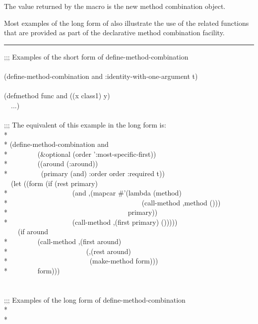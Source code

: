 \begin{defmac}

The value returned by the  macro is the new
method combination object.


Most examples of the long form of  also
illustrate the use of the related functions that are provided as part
of the declarative method combination facility.

\hrule width0pt\relax

\begin{lisp}
;;; Examples of the short form of define-method-combination \\
\\
(define-method-combination and :identity-with-one-argument t) \\
\\
(defmethod func and ((x class1) y) \\
~~...) \\
\\
;;; The equivalent of this example in the long form is: \\*
\\*
(define-method-combination and \\*
~~~~~~~~(\&optional (order ':most-specific-first)) \\*
~~~~~~~~((around (:around)) \\*
~~~~~~~~~(primary (and) :order order :required t)) \\
~~(let ((form (if (rest primary) \\*
~~~~~~~~~~~~~~~~~~{\Xbq}(and ,{\Xatsign}(mapcar \#'(lambda (method) \\*
~~~~~~~~~~~~~~~~~~~~~~~~~~~~~~~~~~~~~~{\Xbq}(call-method ,method ())) \\*
~~~~~~~~~~~~~~~~~~~~~~~~~~~~~~~~~~primary)) \\*
~~~~~~~~~~~~~~~~~~{\Xbq}(call-method ,(first primary) ())))) \\
~~~~(if around \\*
~~~~~~~~{\Xbq}(call-method ,(first around) \\*
~~~~~~~~~~~~~~~~~~~~~~(,{\Xatsign}(rest around) \\*
~~~~~~~~~~~~~~~~~~~~~~~(make-method form))) \\*
~~~~~~~~form))) \\
\\
\\
;;; Examples of the long form of define-method-combination \\*
\\*

\end{lisp}
\end{defmac}
